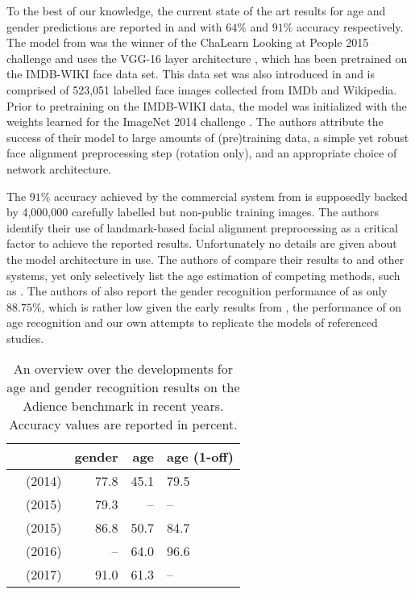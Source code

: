 \documentclass[10pt,twocolumn,letterpaper]{article}
\begin{document}
To the best of our knowledge, the current state of the art results for age and gender predictions are reported in \cite{rothe2016deep} and \cite{dehghan2017dager} with $64\%$ and $91\%$ accuracy respectively. The model from \cite{rothe2016deep} was the winner of the ChaLearn Looking at People 2015 challenge \cite{escalera2015chalearn} and uses the VGG-16 layer architecture \cite{simonyan2014very}, which has been pretrained on the IMDB-WIKI face data set. This data set was also introduced in \cite{rothe2016deep} and is comprised of 523,051 labelled face images collected from IMDb and Wikipedia. Prior to pretraining on the IMDB-WIKI data, the model was initialized with the weights learned for the ImageNet 2014 challenge \cite{russakovsky2015imagenet}. The authors attribute the success of their model to large amounts of (pre)training data, a simple yet robust face alignment preprocessing step (rotation only), and an appropriate choice of network architecture. 

The $91\%$ accuracy achieved by the commercial system from \cite{dehghan2017dager} is supposedly backed by 4,000,000 carefully labelled but non-public training images.
The authors identify their use of landmark-based facial alignment preprocessing as a critical factor to achieve the reported results.
Unfortunately no details are given about the model architecture in use. The authors of \cite{dehghan2017dager} compare their results to \cite{rothe2016deep} and other systems, yet only selectively list the age estimation of competing methods, such as \cite{rothe2016deep}.
The authors of \cite{dehghan2017dager} also report the gender recognition performance of \cite{rothe2016deep} as only $88.75\%$, which is rather low given the early results from \cite{levi2015age}, the performance of \cite{rothe2016deep} on age recognition and our own attempts to replicate the models of referenced studies.



\begin{table}
\begin{center}
\begin{tabular}{ll|r|rl}
&& gender & age & age (1-off) \\
\hline
\cite{eidinger2014age}		&(2014) 	& 77.8 	& 45.1 	& 79.5 \\
\cite{hassner2015effective}	&(2015)		& 79.3 	& -- 	& -- \\
\cite{levi2015age}			&(2015) 	& 86.8 	& 50.7 	& 84.7 \\
\cite{rothe2016deep}		&(2016) 	& -- 	& 64.0 	& 96.6 \\
\cite{dehghan2017dager} 	& (2017) 	& 91.0 	& 61.3 	& -- \\
\hline
\end{tabular}
\end{center}
	\caption{An overview over the developments for age and gender recognition results on the Adience benchmark in recent years. Accuracy values are reported in percent.
}
	\label{tab:overview}
\end{table}
\end{document}
